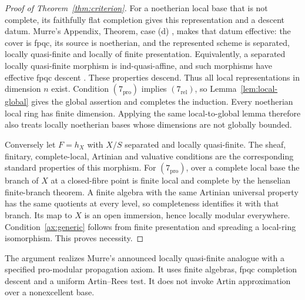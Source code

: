 \begin{proof}[Proof of Theorem~\ref{thm:criterion}]
For a noetherian local base that is not complete, its faithfully flat completion gives this representation and a descent datum. Murre's Appendix, Theorem, case (d) \cite[\S4, pp.~259--260]{Murre}, makes that datum effective: the cover is fpqc, its source is noetherian, and the represented scheme is separated, locally quasi-finite and locally of finite presentation. Equivalently, a separated locally quasi-finite morphism is ind-quasi-affine, and such morphisms have effective fpqc descent \cite[Tags 0AP9 and 0APK]{Stacks}. These properties descend. Thus all local representations in dimension $n$ exist. Condition $(7_{\mathrm{pro}})$ implies $(7_{\mathrm{rel}})$, so Lemma~\ref{lem:local-global} gives the global assertion and completes the induction. Every noetherian local ring has finite dimension. Applying the same local-to-global lemma therefore also treats locally noetherian bases whose dimensions are not globally bounded.

Conversely let $F=h_X$ with $X/S$ separated and locally quasi-finite. The sheaf, finitary, complete-local, Artinian and valuative conditions are the corresponding standard properties of this morphism. For $(7_{\mathrm{pro}})$, over a complete local base the branch of $X$ at a closed-fibre point is finite local and complete by the henselian finite-branch theorem. A finite algebra with the same Artinian universal property has the same quotients at every level, so completeness identifies it with that branch. Its map to $X$ is an open immersion, hence locally modular everywhere. Condition~\ref{ax:generic} follows from finite presentation and spreading a local-ring isomorphism. This proves necessity.
\end{proof}

The argument realizes Murre's announced locally quasi-finite analogue with a specified pro-modular propagation axiom. It uses finite algebras, fpqc completion descent and a uniform Artin--Rees test. It does not invoke Artin approximation over a nonexcellent base.
